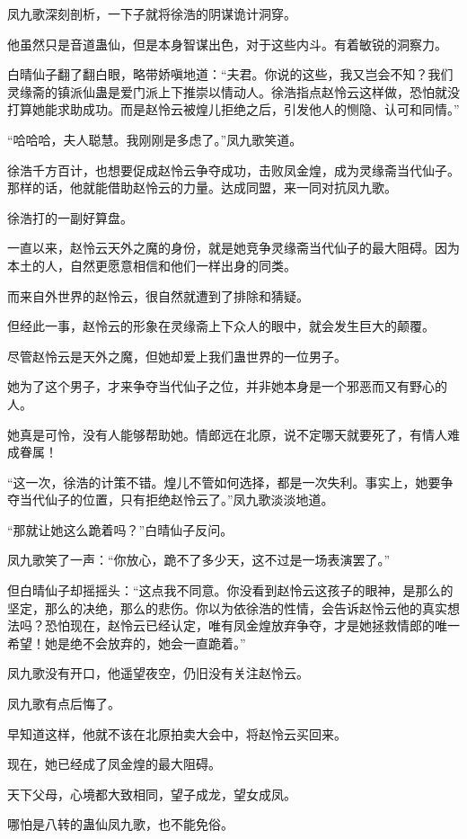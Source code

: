 \begin{this_body}
凤九歌深刻剖析，一下子就将徐浩的阴谋诡计洞穿。

他虽然只是音道蛊仙，但是本身智谋出色，对于这些内斗。有着敏锐的洞察力。

白晴仙子翻了翻白眼，略带娇嗔地道：“夫君。你说的这些，我又岂会不知？我们灵缘斋的镇派仙蛊是爱门派上下推崇以情动人。徐浩指点赵怜云这样做，恐怕就没打算她能求助成功。而是赵怜云被煌儿拒绝之后，引发他人的恻隐、认可和同情。”

“哈哈哈，夫人聪慧。我刚刚是多虑了。”凤九歌笑道。

徐浩千方百计，也想要促成赵怜云争夺成功，击败凤金煌，成为灵缘斋当代仙子。那样的话，他就能借助赵怜云的力量。达成同盟，来一同对抗凤九歌。

徐浩打的一副好算盘。

一直以来，赵怜云天外之魔的身份，就是她竞争灵缘斋当代仙子的最大阻碍。因为本土的人，自然更愿意相信和他们一样出身的同类。

而来自外世界的赵怜云，很自然就遭到了排除和猜疑。

但经此一事，赵怜云的形象在灵缘斋上下众人的眼中，就会发生巨大的颠覆。

尽管赵怜云是天外之魔，但她却爱上我们蛊世界的一位男子。

她为了这个男子，才来争夺当代仙子之位，并非她本身是一个邪恶而又有野心的人。

她真是可怜，没有人能够帮助她。情郎远在北原，说不定哪天就要死了，有情人难成眷属！

“这一次，徐浩的计策不错。煌儿不管如何选择，都是一次失利。事实上，她要争夺当代仙子的位置，只有拒绝赵怜云了。”凤九歌淡淡地道。

“那就让她这么跪着吗？”白晴仙子反问。

凤九歌笑了一声：“你放心，跪不了多少天，这不过是一场表演罢了。”

但白晴仙子却摇摇头：“这点我不同意。你没看到赵怜云这孩子的眼神，是那么的坚定，那么的决绝，那么的悲伤。你以为依徐浩的性情，会告诉赵怜云他的真实想法吗？恐怕现在，赵怜云已经认定，唯有凤金煌放弃争夺，才是她拯救情郎的唯一希望！她是绝不会放弃的，她会一直跪着。”

凤九歌没有开口，他遥望夜空，仍旧没有关注赵怜云。

凤九歌有点后悔了。

早知道这样，他就不该在北原拍卖大会中，将赵怜云买回来。

现在，她已经成了凤金煌的最大阻碍。

天下父母，心境都大致相同，望子成龙，望女成凤。

哪怕是八转的蛊仙凤九歌，也不能免俗。


\end{this_body}
